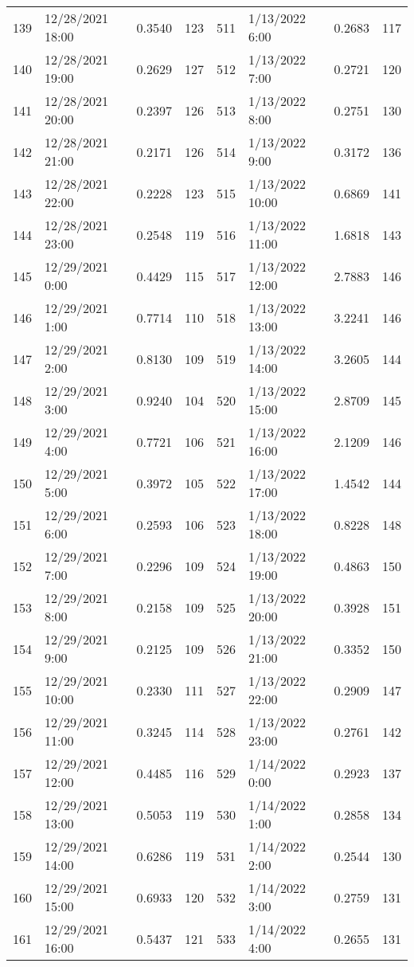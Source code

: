 \begin{center}
\begin{longtable}{llccllcc}
    139&12/28/2021 18:00&0.3540&123&511&1/13/2022 6:00	    &0.2683&117 \\
    140&12/28/2021 19:00&0.2629&127&512&1/13/2022 7:00	    &0.2721&120 \\
    141&12/28/2021 20:00&0.2397&126&513&1/13/2022 8:00	    &0.2751&130 \\
    142&12/28/2021 21:00&0.2171&126&514&1/13/2022 9:00	    &0.3172&136 \\
    143&12/28/2021 22:00&0.2228&123&515&1/13/2022 10:00	    &0.6869&141 \\
    144&12/28/2021 23:00&0.2548&119&516&1/13/2022 11:00	    &1.6818&143 \\
    145&12/29/2021 0:00	   &0.4429&115&517&1/13/2022 12:00	    &2.7883&146 \\
    146&12/29/2021 1:00	   &0.7714&110&518&1/13/2022 13:00	    &3.2241&146 \\
    147&12/29/2021 2:00	   &0.8130&109&519&1/13/2022 14:00	    &3.2605&144 \\
    148&12/29/2021 3:00	   &0.9240&104&520&1/13/2022 15:00	    &2.8709&145 \\
    149&12/29/2021 4:00	   &0.7721&106&521&1/13/2022 16:00	    &2.1209&146 \\
    150&12/29/2021 5:00	   &0.3972&105&522&1/13/2022 17:00	    &1.4542&144 \\
    151&12/29/2021 6:00	   &0.2593&106&523&1/13/2022 18:00	    &0.8228&148 \\
    152&12/29/2021 7:00	   &0.2296&109&524&1/13/2022 19:00	    &0.4863&150 \\
    153&12/29/2021 8:00	   &0.2158&109&525&1/13/2022 20:00	    &0.3928&151 \\
    154&12/29/2021 9:00	   &0.2125&109&526&1/13/2022 21:00	    &0.3352&150 \\
    155&12/29/2021 10:00&0.2330&111&527&1/13/2022 22:00	    &0.2909&147 \\
    156&12/29/2021 11:00&0.3245&114&528&1/13/2022 23:00	    &0.2761&142 \\
    157&12/29/2021 12:00&0.4485&116&529&1/14/2022 0:00	    &0.2923&137 \\
    158&12/29/2021 13:00&0.5053&119&530&1/14/2022 1:00	    &0.2858&134 \\
    159&12/29/2021 14:00&0.6286&119&531&1/14/2022 2:00	    &0.2544&130 \\
    160&12/29/2021 15:00&0.6933&120&532&1/14/2022 3:00	    &0.2759&131 \\
    161&12/29/2021 16:00&0.5437&121&533&1/14/2022 4:00	    &0.2655&131 \\

\end{longtable}
\end{center}
